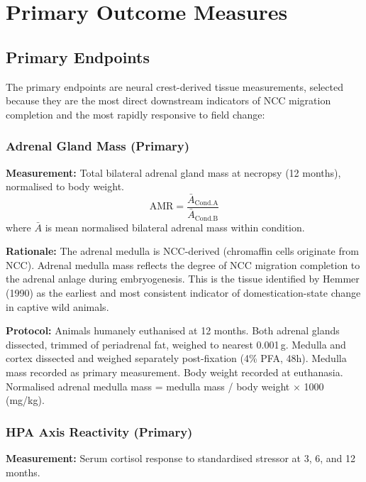 \documentclass[10pt, a4paper]{article}
\begin{document}
\section{Primary Outcome Measures}
\label{sec:outcomes}

\subsection{Primary Endpoints}

The primary endpoints are neural crest-derived
tissue measurements, selected because they are
the most direct downstream indicators of NCC
migration completion and the most rapidly
responsive to field change:

\subsubsection{Adrenal Gland Mass (Primary)}

\textbf{Measurement:} Total bilateral adrenal
gland mass at necropsy (12 months), normalised
to body weight.
\[
  \text{AMR} = \frac{\bar{A}_{\text{Cond.A}}}
                    {\bar{A}_{\text{Cond.B}}}
\]
where $\bar{A}$ is mean normalised bilateral
adrenal mass within condition.

\textbf{Rationale:} The adrenal medulla is
NCC-derived (chromaffin cells originate from
NCC). Adrenal medulla mass reflects the degree
of NCC migration completion to the adrenal
anlage during embryogenesis. This is the tissue
identified by Hemmer (1990) as the earliest and
most consistent indicator of domestication-state
change in captive wild animals.

\textbf{Protocol:}
Animals humanely euthanised at 12 months.
Both adrenal glands dissected, trimmed of
periadrenal fat, weighed to nearest 0.001\,g.
Medulla and cortex dissected and weighed
separately post-fixation (4\% PFA, 48h).
Medulla mass recorded as primary measurement.
Body weight recorded at euthanasia.
Normalised adrenal medulla mass =
medulla mass / body weight $\times$ 1000
(mg/kg).

\subsubsection{HPA Axis Reactivity (Primary)}

\textbf{Measurement:} Serum cortisol response
to standardised stressor at 3, 6, and 12 months.
\end{document}

